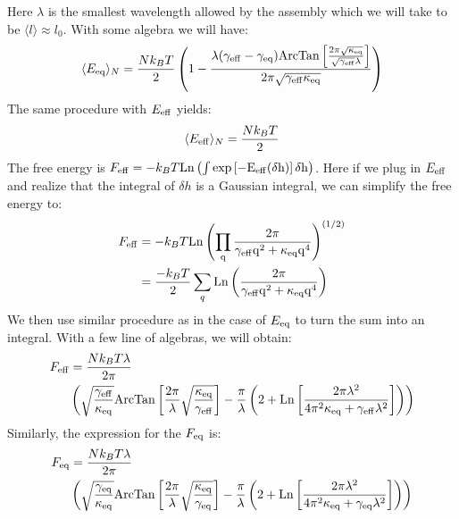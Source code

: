 \documentclass[amsmath,preprintnumbers,10pt,nofootinbib,prl,twocolumn]{revtex4-1}
\begin{document}
Here $\lambda$ is the smallest wavelength allowed by the assembly which we will take to be $\langle l \rangle \approx l_0$. With some algebra we will have:
\begin{equation}
    \langle E_{\rm eq}\rangle_N=\frac{N k_BT}{2}\left(1 - \frac{\lambda(\gamma_{\rm eff}-\gamma_{\rm eq})\rm{ArcTan}\left[\frac{2\pi\sqrt{\kappa_{\rm eq}}}{\sqrt{\gamma_{\rm eff}}\lambda}\right]}{2\pi\sqrt{\gamma_{\rm eff}\kappa_{\rm eq}}}\right)
\end{equation}
The same procedure with $E_{\rm eff}$ yields:
\begin{equation}
    \langle E_{\rm eff}\rangle_N=\frac{N k_BT}{2}
\end{equation}
The free energy is $F_{\rm eff} = -k_BT\rm{Ln}\left(\int \exp\left[-E_{\rm{eff}}(\delta h)\right]\delta h\right)$. Here if we plug in $E_{\rm eff}$ and realize that the integral of $\delta h$ is a Gaussian integral, we can simplify the free energy to:
\begin{equation}
\begin{split}
    F_{\rm eff}&= -k_BT\rm{Ln}\left(\prod_q\frac{2\pi}{\gamma_{\rm eff} q^2+\kappa_{\rm eq} q^4}\right)^{(1/2)}\\
&=\frac{ -k_BT}{2}\sum_q\rm{Ln}\left(\frac{2\pi}{\gamma_{\rm eff} q^2+\kappa_{\rm eq} q^4}\right)
\end{split}
\end{equation}
We then use similar procedure as in the case of $E_{\rm eq}$ to turn the sum into an integral. With a few line of algebras, we will obtain:
\begin{equation}
\begin{split}
     F_{\rm eff}&=\frac{N k_BT\lambda}{2\pi}\\
     &\left(\sqrt{\frac{\gamma_{\rm eff}}{\kappa_{\rm eq}}}\rm{ArcTan}\left[\frac{2\pi}{\lambda}\sqrt{\frac{\kappa_{\rm eq}}{\gamma_{\rm eff}}}\right]-\frac{\pi}{\lambda}\left(2+\rm{Ln}\left[\frac{2\pi\lambda^2}{4\pi^2\kappa_{\rm eq}+\gamma_{\rm eff}\lambda^2}\right]\right)\right)
\end{split}
\end{equation}
Similarly, the expression for the $F_{\rm eq}$ is:
\begin{equation}
\begin{split}
     F_{\rm eq}&=\frac{N k_BT\lambda}{2\pi}\\
     &\left(\sqrt{\frac{\gamma_{\rm eq}}{\kappa_{\rm eq}}}\rm{ArcTan}\left[\frac{2\pi}{\lambda}\sqrt{\frac{\kappa_{\rm eq}}{\gamma_{\rm eq}}}\right]-\frac{\pi}{\lambda}\left(2+\rm{Ln}\left[\frac{2\pi\lambda^2}{4\pi^2\kappa_{\rm eq}+\gamma_{\rm eq}\lambda^2}\right]\right)\right)
\end{split}
\end{equation}
\end{document}

